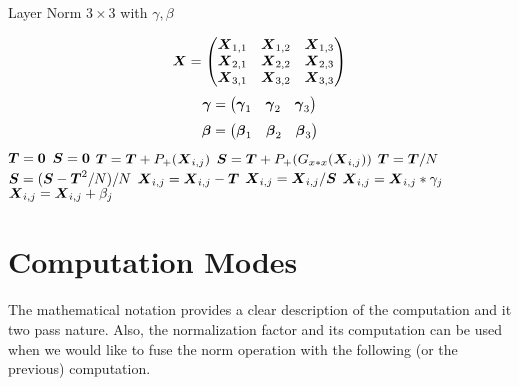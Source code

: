 \documentclass[acmsmall]{acmart}
\begin{document}
\begin{algorithm}
    \caption{Layer Norm $3\times 3$ with $\gamma, \beta$}
    \label{alg:l2_4}
    \begin{algorithmic}
      \STATE \[
        {\boldsymbol X}  =   \begin{pmatrix}
          {\boldsymbol X}_{1,1} &    {\boldsymbol X}_{1,2}&    {\boldsymbol X}_{1,3}  \\
          {\boldsymbol X}_{2,1} &    {\boldsymbol X}_{2,2}&    {\boldsymbol X}_{2,3}  \\
          {\boldsymbol X}_{3,1} &    {\boldsymbol X}_{3,2}&    {\boldsymbol X}_{3,3}  \\
        \end{pmatrix}
      \] 
      \STATE \[
        {\boldsymbol \gamma}  =   \begin{pmatrix}
          {\boldsymbol \gamma}_{1} &    {\boldsymbol \gamma}_{2}&    {\boldsymbol \gamma}_{3}  \\
        \end{pmatrix}
      \] 
      \STATE \[
        {\boldsymbol \beta}  =   \begin{pmatrix}
          {\boldsymbol \beta}_{1} &    {\boldsymbol \beta}_{2}&    {\boldsymbol \beta}_{3}  \\
        \end{pmatrix}
      \] 
          \STATE ${\boldsymbol T} = {\boldsymbol 0} $ 
          \STATE ${\boldsymbol S} = {\boldsymbol 0} $ 
              \STATE ${\boldsymbol T} = {\boldsymbol T} +P_+({\boldsymbol X}_{i,j})$               
              \STATE ${\boldsymbol S} = {\boldsymbol T} +P_+(G_{x*x}({\boldsymbol X}_{i,j}))$   
          \ENDWHILE
          \STATE ${\boldsymbol T}  =   {\boldsymbol T}/N$       
          \STATE ${\boldsymbol S}  =   ({\boldsymbol S} - {\boldsymbol T}^2/N)/N$       
             \STATE $ {\boldsymbol X}_{i,j} = {\boldsymbol X}_{i,j}-{\boldsymbol T}$  
             \STATE $ {\boldsymbol X}_{i,j} = {\boldsymbol X}_{i,j}/{\boldsymbol S}$   
             \STATE $ {\boldsymbol X}_{i,j} = {\boldsymbol X}_{i,j}*\gamma_j$   
             \STATE $ {\boldsymbol X}_{i,j} = {\boldsymbol X}_{i,j} + \beta_j$   
          \ENDWHILE
      \ENDWHILE
    \end{algorithmic}
\end{algorithm}


\section{Computation Modes} 
The mathematical notation provides a clear description of the
computation and it two pass nature. Also, the normalization factor and
its computation can be used when we would like to fuse the norm
operation with the following (or the previous) computation.
\end{document}
